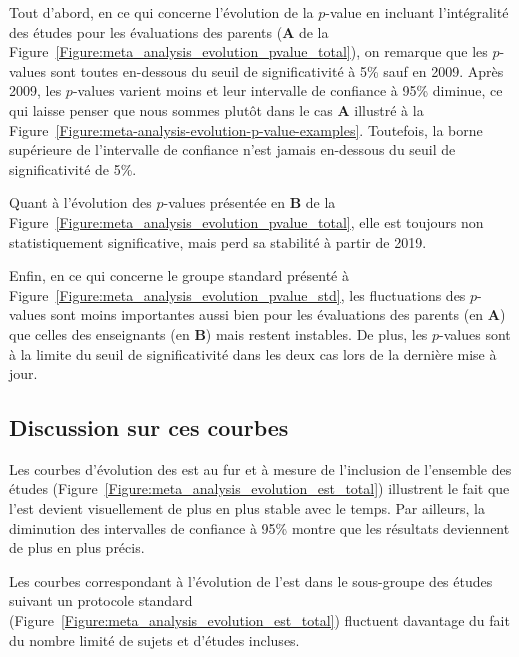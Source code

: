 \clearpage

Tout d'abord, en ce qui concerne l'évolution de la $p$-value en incluant l'intégralité des études pour les 
évaluations des parents (\textbf{A} de la Figure~\ref{Figure:meta_analysis_evolution_pvalue_total}), on remarque que les $p$-values sont toutes
en-dessous du seuil de significativité à 5\% sauf en 2009. Après 2009, les $p$-values varient moins et leur intervalle de confiance à 95\% diminue, 
ce qui laisse penser que nous sommes plutôt dans le cas \textbf{A} illustré à la Figure~\ref{Figure:meta-analysis-evolution-p-value-examples}. Toutefois,
la borne supérieure de l'intervalle de confiance n'est jamais en-dessous du seuil de significativité de 5\%.

Quant à l'évolution des $p$-values présentée en \textbf{B} de la Figure~\ref{Figure:meta_analysis_evolution_pvalue_total}, elle est
toujours non statistiquement significative, mais perd sa stabilité à partir de 2019.

Enfin, en ce qui concerne le groupe standard présenté à Figure~\ref{Figure:meta_analysis_evolution_pvalue_std}, les fluctuations des $p$-values 
sont moins importantes aussi bien pour les évaluations 
des parents (en \textbf{A}) que celles des enseignants (en \textbf{B}) mais restent instables. 
De plus, les $p$-values sont à la limite du seuil de significativité dans les deux cas lors de la dernière mise à jour.

\subsection{Discussion sur ces courbes}

Les courbes d'évolution des \gls{est} au fur et à mesure de l'inclusion de l'ensemble des études (Figure~\ref{Figure:meta_analysis_evolution_est_total}) 
illustrent le fait que l'\gls{est} 
devient visuellement de plus en plus stable avec le temps. Par ailleurs, la diminution des intervalles de confiance à 95\% montre que les résultats 
deviennent de plus en plus précis.

Les courbes correspondant à l'évolution de l'\gls{est} dans le sous-groupe des études suivant un protocole standard (Figure~\ref{Figure:meta_analysis_evolution_est_total}) 
fluctuent davantage du fait du nombre limité de sujets et d'études incluses.

